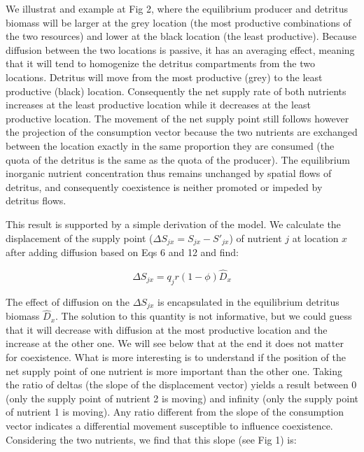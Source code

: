 \documentclass[letterpaper,twocolumn,showkeys]{revtex4-1}
\begin{document}
We illustrat and example at Fig 2, where the equilibrium producer and detritus biomass will be larger at the grey location (the most productive combinations of the two resources) and lower at the black location (the least productive). Because diffusion between the two locations is passive, it has an averaging effect, meaning that it will tend to homogenize the detritus compartments from the two locations. Detritus will move from the most productive (grey) to the least productive (black) location. Consequently the net supply rate of both nutrients increases at the least productive location  while it decreases at the least productive location. The movement of the net supply point still follows however the projection of the consumption vector because the two nutrients are exchanged between the location exactly in the same proportion they are consumed (the quota of the detritus is the same as the quota of the producer). The equilibrium inorganic nutrient concentration thus remains unchanged by spatial flows of detritus, and consequently coexistence is neither promoted or impeded by detritus flows.

	This result is supported by a simple derivation of the model. We calculate the displacement of the supply point ($\Delta S_{jx} = S_{jx}  - S'_{jx}$) of nutrient $j$ at location $x$ after adding diffusion based on Eqs 6 and 12 and find:

\begin{equation}
	\label{e:bnet}
	\Delta S_{jx}=q_{j}r(1-\phi)\widehat{D}_{x}
\end{equation}

The effect of diffusion on the $\Delta S_{jx}$ is encapsulated in the equilibrium detritus biomass $\widehat{D}_x$. The solution to this quantity is not informative, but we could guess that it will decrease with diffusion at the most productive location and the increase at the other one. We will see below that at the end it does not matter for coexistence. What is more interesting is to understand if the position of the net supply point of one nutrient is more important than the other one. Taking the ratio of deltas (the slope of the displacement vector) yields a result between 0 (only the supply point of nutrient 2 is moving) and infinity (only the supply point of nutrient 1 is moving). Any ratio different from the slope of the consumption vector indicates a differential movement susceptible to influence coexistence. Considering the two nutrients, we find that this slope (see Fig 1) is:
\end{document}
